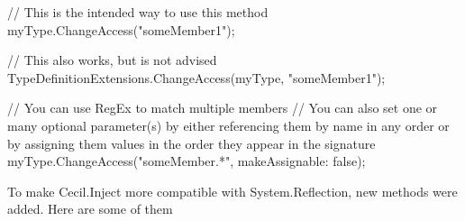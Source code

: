 \documentclass[a4paper,11pt]{article}
\newcommand{\CecilInject}{\textsc{C}{\scriptsize \sc ecil}.\textsc{I}{\scriptsize \sc nject}}
\begin{document}
\begin{mdef}
\begin{cs}
// This is the intended way to use this method
myType.ChangeAccess("someMember1");

// This also works, but is not advised
TypeDefinitionExtensions.ChangeAccess(myType, "someMember1");



// You can use RegEx to match multiple members
// You can also set one or many optional parameter(s) by either referencing them by name in any order or by assigning them values in the order they appear in the signature
myType.ChangeAccess("someMember.*", makeAssignable: false);
\end{cs}
\end{mdef}

To make \CecilInject{} more compatible with System.Reflection, new methods were added. Here are some of them
\end{document}
